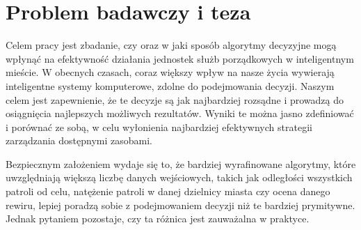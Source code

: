 \section{Problem badawczy i teza}

\par Celem pracy jest zbadanie, czy oraz w jaki sposób algorytmy decyzyjne mogą wpłynąć na efektywność działania jednostek służb porządkowych w inteligentnym mieście. W obecnych czasach, coraz większy wpływ na nasze życia wywierają inteligentne systemy komputerowe, zdolne do podejmowania decyzji. Naszym celem jest zapewnienie, że te decyzje są jak najbardziej rozsądne i prowadzą do osiągnięcia najlepszych możliwych rezultatów. Wyniki te można jasno zdefiniować i porównać ze sobą, w celu wyłonienia najbardziej efektywnych strategii zarządzania dostępnymi zasobami.

\par Bezpiecznym założeniem wydaje się to, że bardziej wyrafinowane algorytmy, które uwzględniają większą liczbę danych wejściowych, takich jak odległości wszystkich patroli od celu, natężenie patroli w danej dzielnicy miasta czy ocena danego rewiru, lepiej poradzą sobie z podejmowaniem decyzji niż te bardziej prymitywne. Jednak pytaniem pozostaje, czy ta różnica jest zauważalna w praktyce.